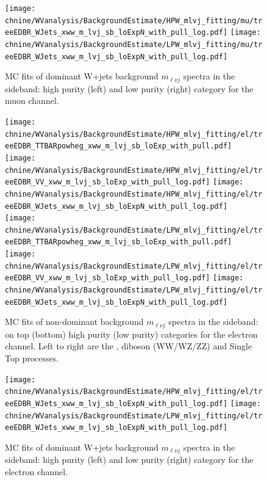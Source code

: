 \begin{figure}[htbp]
\centering
\texttt{[image: \\chnine/WVanalysis/BackgroundEstimate/HPW\_mlvj\_fitting/mu/treeEDBR\_WJets\_xww\_m\_lvj\_sb\_loExpN\_with\_pull\_log.pdf]}
\texttt{[image: \\chnine/WVanalysis/BackgroundEstimate/LPW\_mlvj\_fitting/mu/treeEDBR\_WJets\_xww\_m\_lvj\_sb\_loExpN\_with\_pull\_log.pdf]}\\
\caption{MC fits of dominant W+jets background $m_{\ell\nu j}$ spectra in the \mJ sideband:
high purity (left) and low purity (right) category for the muon channel.}
\label{fig:sbfitmlvj_1b}
\end{figure}


\begin{figure}[htbp]
\centering
\texttt{[image: \\chnine/WVanalysis/BackgroundEstimate/HPW\_mlvj\_fitting/el/treeEDBR\_TTBARpowheg\_xww\_m\_lvj\_sb\_loExp\_with\_pull.pdf]}
\texttt{[image: \\chnine/WVanalysis/BackgroundEstimate/HPW\_mlvj\_fitting/el/treeEDBR\_VV\_xww\_m\_lvj\_sb\_loExp\_with\_pull\_log.pdf]}
\texttt{[image: \\chnine/WVanalysis/BackgroundEstimate/HPW\_mlvj\_fitting/el/treeEDBR\_WJets\_xww\_m\_lvj\_sb\_loExpN\_with\_pull\_log.pdf]}\\
\texttt{[image: \\chnine/WVanalysis/BackgroundEstimate/LPW\_mlvj\_fitting/el/treeEDBR\_TTBARpowheg\_xww\_m\_lvj\_sb\_loExp\_with\_pull.pdf]}
\texttt{[image: \\chnine/WVanalysis/BackgroundEstimate/LPW\_mlvj\_fitting/el/treeEDBR\_VV\_xww\_m\_lvj\_sb\_loExp\_with\_pull\_log.pdf]}
\texttt{[image: \\chnine/WVanalysis/BackgroundEstimate/LPW\_mlvj\_fitting/el/treeEDBR\_WJets\_xww\_m\_lvj\_sb\_loExpN\_with\_pull\_log.pdf]}\\
\caption{MC fits of non-dominant background $m_{\ell\nu j}$ spectra in the \mJ sideband: on top (bottom) high purity (low purity) categories
for the electron channel. Left to right are the \ttbar, diboson (WW/WZ/ZZ) and Single Top processes.}
\label{fig:sbfitmlvj_2}
\end{figure}

\begin{figure}[htbp]
\centering
\texttt{[image: \\chnine/WVanalysis/BackgroundEstimate/HPW\_mlvj\_fitting/el/treeEDBR\_WJets\_xww\_m\_lvj\_sb\_loExpN\_with\_pull\_log.pdf]}
\texttt{[image: \\chnine/WVanalysis/BackgroundEstimate/LPW\_mlvj\_fitting/el/treeEDBR\_WJets\_xww\_m\_lvj\_sb\_loExpN\_with\_pull\_log.pdf]}\\
\caption{MC fits of dominant W+jets background $m_{\ell\nu j}$ spectra in the \mJ sideband:
high purity (left) and low purity (right) category for the electron channel.}
\label{fig:sbfitmlvj_2b}
\end{figure}

